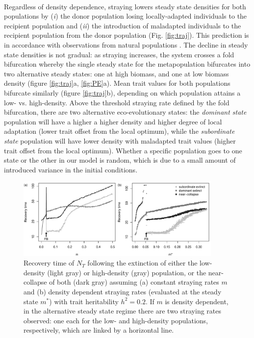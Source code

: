 \documentclass[twocolumn,preprintnumbers,amsmath,amssymb,superscriptaddress]{revtex4}
\begin{document}
 \\
\noindent Regardless of density dependence, straying lowers steady state densities for both populations by (\emph{i}) the donor population losing locally-adapted individuals to the recipient population and (\emph{ii}) the introduction of maladapted individuals to the recipient population from the donor population (Fig. \ref{fig:traj}).
This prediction is in accordance with observations from natural populations \cite{Bett:2017ha}. %
The decline in steady state densities is not gradual: as straying increases, the system crosses a fold bifurcation whereby the single steady state for the metapopulation bifurcates into two alternative steady states: one at high biomass, and one at low biomass density (figure \ref{fig:traj}a, \ref{fig:PE}a).
Mean trait values for both populations bifurcate similarly (figure \ref{fig:traj}b), depending on which population attains a low- vs. high-density. 
Above the threshold straying rate defined by the fold bifurcation, there are two alternative eco-evolutionary states: the \emph{dominant state} population will have a higher a higher density and higher degree of local adaptation (lower trait offset from the local optimum), while the \emph{subordinate state} population will have lower density with maladapted trait values (higher trait offset from the local optimum). 
Whether a specific population goes to one state or the other in our model is random, which is due to a small amount of introduced variance in the initial conditions.


\begin{figure}
  \captionsetup{justification=raggedright,
singlelinecheck=false
}
\centering
\includegraphics[width=0.9\textwidth]{figs2/fig_relax_lowh.pdf}
\caption{
Recovery time of $N_T$ following the extinction of either the low-density (light gray) or high-density (gray) population, or the near-collapse of both (dark gray) assuming (a) constant straying rates $m$ and (b) density dependent straying rates (evaluated at the steady state $m^*$) with trait heritability $h^2=0.2$.
If $m$ is density dependent, in the alternative steady state regime there are two straying rates observed: one each for the low- and high-density populations, respectively, which are linked by a horizontal line.
} \label{fig:relax}
\end{figure}
\end{document}
